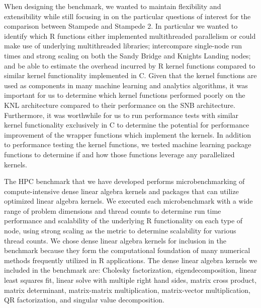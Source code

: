When designing the benchmark, we wanted to maintain flexibility and extensibility while
still focusing in on the particular questions of interest for the comparison between
Stampede and Stampede 2. In particular we wanted to identify which R functions either
implemented multithreaded parallelism or could make use of underlying multithreaded
libraries; intercompare single-node run times and strong scaling on both the Sandy Bridge
and Knights Landing nodes; and be able to estimate the overhead incurred by R kernel
functions compared to similar kernel functionality implemented in C. Given that the kernel
functions are used as components in many machine learning and analytics algorithms, it was
important for us to determine which kernel functions performed poorly on the KNL
architecture compared to their performance on the SNB architecture. Furthermore, it was
worthwhile for us to run performance tests with similar kernel functionality exclusively
in C to determine the potential for performance improvement of the wrapper functions which
implement the kernels. In addition to performance testing the kernel functions, we tested
machine learning package functions to determine if and how those functions leverage any
parallelized kernels.

The HPC benchmark that we have developed performs microbenchmarking of compute-intensive
dense linear algebra kernels and packages that can utilize optimized linear algebra
kernels. We executed each microbenchmark with a wide range of problem dimensions and
thread counts to determine run time performance and scalability of the underlying R
functionality on each type of node, using strong scaling as the metric to determine
scalability for various thread counts.
We chose dense linear algebra kernels for inclusion in the benchmark because they form the
computational foundation of many numerical methods frequently utilized in R applications.
The dense linear algebra kernels we included in the benchmark are: Cholesky factorization,
eigendecomposition, linear least squares fit, linear solve with multiple right hand sides, matrix cross product,
matrix determinant, matrix-matrix multiplication, matrix-vector multiplication, QR
factorization, and singular value decomposition.


